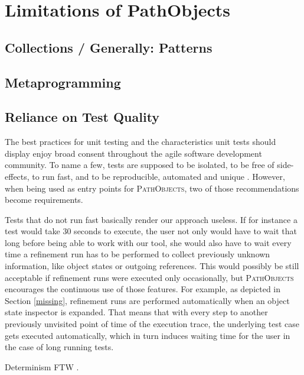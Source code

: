 \section{Limitations of PathObjects}
\subsection{Collections / Generally: Patterns}
\subsection{Metaprogramming}

\subsection{Reliance on Test Quality} 
\label{ss:LimitationsTestQuality}
The best practices for unit testing and the characteristics unit tests should display enjoy broad consent throughout the agile software development community.
To name a few, tests are supposed to be isolated, to be free of side-effects, to run fast, and to be reproducible, automated and unique \cite{meszaros_xunit_2006, beck_test_2002}.
However, when being used as entry points for \textsc{PathObjects}, two of those recommendations become requirements.

Tests that do not run fast basically render our approach useless.
If for instance a test would take 30 seconds to execute, the user not only would have to wait that long before being able to work with our tool, she would also have to wait every time a refinement run has to be performed to collect previously unknown information, like object states or outgoing references.
This would possibly be still acceptable if refinement runs were executed only occasionally, but \textsc{PathObjects} encourages the continuous use of those features.
For example, as depicted in Section \ref{missing}, refinement runs are performed automatically when an object state inspector is expanded.
That means that with every step to another previously unvisited point of time of the execution trace, the underlying test case gets executed automatically, which in turn induces waiting time for the user in the case of long running tests.

Determinism FTW \cite{choi_deterministic_1998, felgentreff_comparison_2012}.